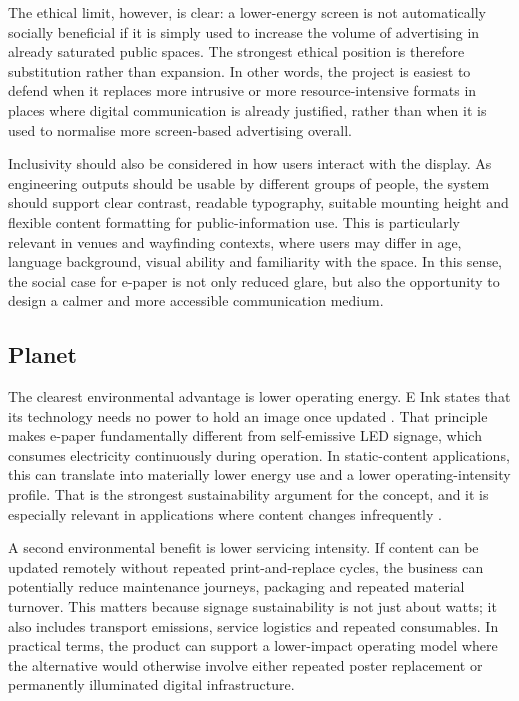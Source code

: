 \documentclass[11pt,a4paper]{article}
\begin{document}
The ethical limit, however, is clear: a lower-energy screen is not automatically socially beneficial if it is simply used to increase the volume of advertising in already saturated public spaces. The strongest ethical position is therefore substitution rather than expansion. In other words, the project is easiest to defend when it replaces more intrusive or more resource-intensive formats in places where digital communication is already justified, rather than when it is used to normalise more screen-based advertising overall.

Inclusivity should also be considered in how users interact with the display. As engineering outputs should be usable by different groups of people, the system should support clear contrast, readable typography, suitable mounting height and flexible content formatting for public-information use. This is particularly relevant in venues and wayfinding contexts, where users may differ in age, language background, visual ability and familiarity with the space. In this sense, the social case for e-paper is not only reduced glare, but also the opportunity to design a calmer and more accessible communication medium.

\subsection{Planet}

The clearest environmental advantage is lower operating energy. E Ink states that its technology needs no power to hold an image once updated \cite{ref2}. That principle makes e-paper fundamentally different from self-emissive LED signage, which consumes electricity continuously during operation. In static-content applications, this can translate into materially lower energy use and a lower operating-intensity profile. That is the strongest sustainability argument for the concept, and it is especially relevant in applications where content changes infrequently \cite{ref2}.

A second environmental benefit is lower servicing intensity. If content can be updated remotely without repeated print-and-replace cycles, the business can potentially reduce maintenance journeys, packaging and repeated material turnover. This matters because signage sustainability is not just about watts; it also includes transport emissions, service logistics and repeated consumables. In practical terms, the product can support a lower-impact operating model where the alternative would otherwise involve either repeated poster replacement or permanently illuminated digital infrastructure.
\end{document}
